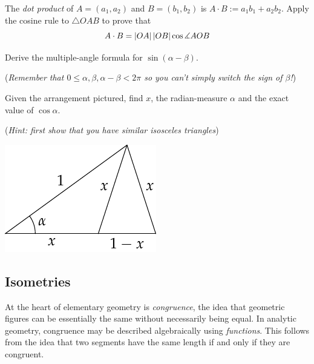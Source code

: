 \begin{exercises}{}{}
\begin{enumerate}
		\item The \emph{dot product} of $A=(a_1,a_2)$ and $B=(b_1,b_2)$ is $A\cdot B:=a_1b_1+a_2b_2$. Apply the cosine rule to $\triangle OAB$ to prove that
		\[
			A\cdot B=\left| OA\right|\left| OB\right|\cos\measuredangle AOB
		\]
		
		
		\item Derive the multiple-angle formula for $\sin(\alpha-\beta)$.\par
		(\emph{Remember that $0\le \alpha,\beta, \alpha-\beta<2\pi$ so you can't simply switch the sign of $\beta$!})
		
		
		\begin{minipage}[t]{0.7\linewidth}\vspace{0pt}
			\item Given the arrangement pictured, find $x$, the radian-measure $\alpha$ and the exact value of $\cos\alpha$.\par
			(\emph{Hint: first show that you have similar isosceles triangles})	
		\end{minipage}
		\hfill
		\begin{minipage}[t]{0.29\linewidth}\vspace{0pt}
			\flushright\includegraphics{angles-sin36}
		\end{minipage}
	\end{enumerate}
\end{exercises}

\clearpage



\subsection{Isometries}\label{sec:klein}

At the heart of elementary geometry is \emph{congruence}, the idea that geometric figures can be essentially the same without necessarily being equal. In analytic geometry, congruence may be described algebraically using \emph{functions}. This follows from the idea that two segments have the same length if and only if they are congruent.

